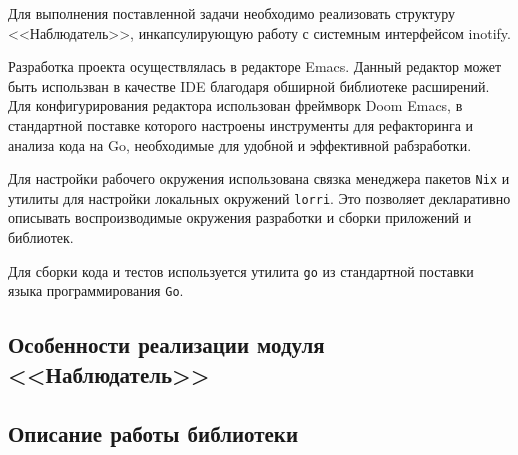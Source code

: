 \documentclass[14pt, russian]{scrartcl}
\newcommand{\code}[1]{\texttt{#1}}
\begin{document}

Для выполнения поставленной задачи необходимо реализовать структуру
<<Наблюдатель>>, инкапсулирующую работу с системным интерфейсом inotify.

Разработка проекта осуществлялась в редакторе Emacs. Данный редактор может быть
использван в качестве IDE благодаря обширной библиотеке расширений. Для
конфигурирования редактора использован фреймворк Doom Emacs, в стандартной
поставке которого настроены инструменты для рефакторинга и анализа кода на Go,
необходимые для удобной и эффективной рабзработки.

Для настройки рабочего окружения использована связка менеджера пакетов
\code{Nix} и утилиты для настройки локальных окружений \code{lorri}. Это
позволяет декларативно описывать воспроизводимые окружения разработки и сборки
приложений и библиотек.

Для сборки кода и тестов используется утилита \code{go} из стандартной поставки
языка программирования \code{Go}.

\subsection{Особенности реализации модуля <<Наблюдатель>>}

\subsection{Описание работы библиотеки}

\end{document}
